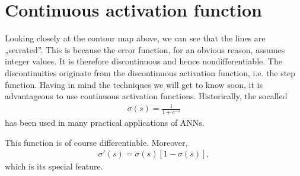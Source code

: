 \documentclass[a4paper,12pt,polish]{jupyterBook}
\begin{document}
\section{Continuous activation function}
\label{\detokenize{docs/backprop:continuous-activation-function}}
\sphinxAtStartPar
Looking closely at the contour map above, we can see that the lines are „serrated”. This is because the error function, for an obvious reason, assumes integer values. It is therefore discontinuous and hence non\sphinxhyphen{}differentiable. The discontinuities originate from the discontinuous activation function, i.e. the step function. Having in mind the techniques we will get to know soon, it is advantageous to use continuous activation functions. Historically, the so\sphinxhyphen{}called 
\begin{equation*}
\begin{split} \sigma(s)=\frac{1}{1+e^{-s}}\end{split}
\end{equation*}
\sphinxAtStartPar
has been used in many practical applications of ANNs.
\begin{sphinxVerbatimInput}

\begin{sphinxVerbatim}[commandchars=\\\{\}]
 
     
\end{sphinxVerbatim}
\end{sphinxVerbatimInput}
\begin{sphinxVerbatimOutput}

\noindent{}
\end{sphinxVerbatimOutput}

\sphinxAtStartPar
This function is of course differentiable. Moreover,
\begin{equation*}
\begin{split} \sigma '(s) = \sigma (s) [1- \sigma (s)], \end{split}
\end{equation*}
\sphinxAtStartPar
which is its special feature.
\begin{sphinxVerbatimInput}

\begin{sphinxVerbatim}[commandchars=\\\{\}]
 
      
\end{sphinxVerbatim}
\end{sphinxVerbatimInput}
\begin{sphinxVerbatimOutput}

\noindent{}
\end{sphinxVerbatimOutput}
\end{document}
